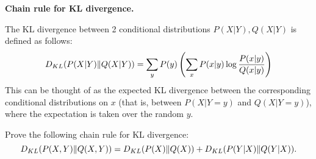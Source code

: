 \item {} \textbf{Chain rule for KL divergence.}

The KL divergence between 2
conditional distributions $P(X|Y),Q(X|Y)$ is defined as follows:
\[
D_{KL}(P(X|Y)\|Q(X|Y))
= \sum_y P(y) \left(\sum_x P(x|y)\log\frac{P(x|y)}{Q(x|y)}\right)
\]
This can be thought of as the expected KL divergence between the
corresponding conditional distributions on $x$ (that is, between
$P(X|Y=y)$ and $Q(X|Y=y)$), where the expectation is taken over the
random $y$.

Prove the following chain rule for KL divergence:
$$ D_{KL}(P(X,Y)\|Q(X,Y)) = D_{KL}(P(X)\|Q(X)) + D_{KL}(P(Y|X)\|Q(Y|X)). $$ \\
